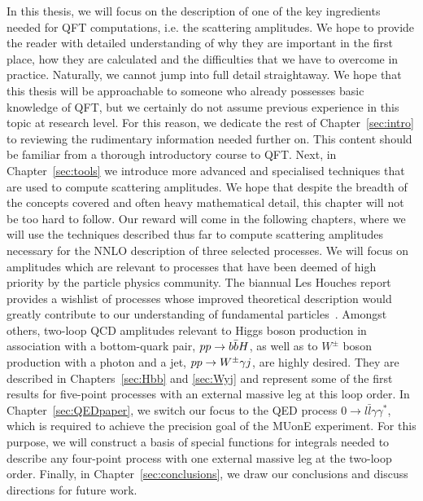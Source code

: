 \documentclass[main.tex]{subfiles}
\begin{document}
In this thesis, we will focus on the description of one of the key ingredients needed for QFT computations, i.e. the scattering amplitudes. We hope to provide the reader with detailed understanding of why they are important in the first place, how they are calculated and the difficulties that we have to overcome in practice. Naturally, we cannot jump into full detail straightaway. We hope that this thesis will be approachable to someone who already possesses basic knowledge of QFT, but we certainly do not assume previous experience in this topic at research level. For this reason, we dedicate the rest of Chapter~\ref{sec:intro} to reviewing the rudimentary information needed further on. This content should be familiar from a thorough introductory course to QFT. Next, in Chapter~\ref{sec:tools} we introduce more advanced and specialised techniques that are used to compute scattering amplitudes. We hope that despite the breadth of the concepts covered and often heavy mathematical detail, this chapter will not be too hard to follow. Our reward will come in the following chapters, where we will use the techniques described thus far to compute scattering amplitudes necessary for the NNLO description of three selected processes. We will focus on amplitudes which are relevant to processes that have been deemed of high priority by the particle physics community. The biannual Les Houches report provides a wishlist of processes whose improved theoretical description would greatly contribute to our understanding of fundamental particles~\cite{Huss:2022ful}. Amongst others, two-loop QCD amplitudes relevant to Higgs boson production in association with a bottom-quark pair, $pp \rightarrow b\bar{b}H$, as well as to $W^\pm$ boson production with a photon and a jet, $pp \rightarrow W^\pm \gamma j$, are highly desired. They are described in Chapters~\ref{sec:Hbb} and \ref{sec:Wyj} and represent some of the first results for five-point processes with an external massive leg at this loop order. In Chapter~\ref{sec:QEDpaper}, we switch our focus to the QED process $0 \to l \bar{l} \gamma \gamma^\ast$, which is required to achieve the precision goal of the MUonE experiment. For this purpose, we will construct a basis of special functions for integrals needed to describe any four-point process with one external massive leg at the two-loop order. Finally, in Chapter~\ref{sec:conclusions}, we draw our conclusions and discuss directions for future work.
\end{document}
